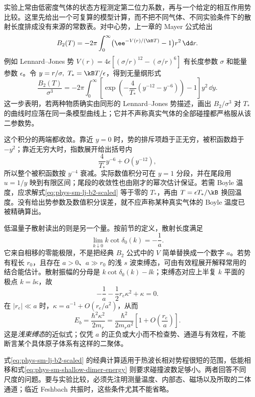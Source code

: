 实验上常由低密度气体的状态方程测定第二位力系数，再与一个给定的相互作用势比较。这里先给出一个可复算的模型计算，而不把不同气体、不同实验条件下的散射长度排成没有来源的常数表。对中心势，上一章的 Mayer 公式给出
\[
B_2(T)=-2\pi\int_0^\infty
\bigl(\ee^{-V(r)/(\kB T)}-1\bigr)r^2\,\dd r.
\]
例如 Lennard--Jones 势
\(V(r)=4\epsilon[(\sigma/r)^{12}-(\sigma/r)^6]\)
有长度参数 \(\sigma\) 和能量参数 \(\epsilon\)。令
\(y=r/\sigma,\ T_*=\kB T/\epsilon\)，得到无量纲形式
\begin{equation}
\frac{B_2(T)}{\sigma^3}
=-2\pi\int_0^\infty
\left[
\exp\!\left(-\frac4{T_*}(y^{-12}-y^{-6})\right)-1
\right]y^2\,\dd y .
\label{eq:phys-sm-lj-b2-scaled}
\end{equation}
这一步表明，若两种物质确实由同形的 Lennard--Jones 势描述，画出 \(B_2/\sigma^3\) 对 \(T_*\) 的曲线时应落在同一条模型曲线上；它并不声称真实气体的全部碰撞都严格服从该二参数势。

这个积分的两端都收敛。靠近 \(y=0\) 时，势的排斥项趋于正无穷，被积函数趋于 \(-y^2\)；靠近无穷大时，指数展开给出括号内
\[
\frac4{T_*}y^{-6}+O(y^{-12}),
\]
所以整个被积函数按 \(y^{-4}\) 衰减。实际数值积分可在 \(y=1\) 分段，并在尾段用 \(u=1/y\) 映到有限区间；尾段的收敛性也由刚才的幂次估计保证。若需 Boyle 温度，应求解式\cref{eq:phys-sm-lj-b2-scaled} 等于零的 \(T_*\)，再由 \(T=\epsilon T_*/\kB\) 换回温度。没有给出势参数及数值积分误差，就不应声称某种真实气体的 Boyle 温度已被精确算出。

低温量子散射读出的则是另一个量。按前节的定义，散射长度满足
\[
\lim_{k\downarrow0}k\cot\delta_0(k)=-\frac1a.
\]
它来自相移的零能极限，不是把经典 \(B_2\) 公式中的 \(V\) 简单替换成一个数字 \(a\)。若势有程长 \(r_0\)，且存在 \(a>0\)、\(a\gg r_0\) 的浅 \(s\) 波束缚态，可由有效程展开解释常用的结合能估计。散射振幅的分母是 \(k\cot\delta_0(k)-\ii k\)；束缚态对应上半复 \(k\) 平面的极点 \(k=\ii\kappa\)，故
\[
-\frac1a-\frac12r_e\kappa^2+\kappa=0.
\]
在 \(|r_e|\ll a\) 时，\(\kappa=a^{-1}+O(r_e/a^2)\)，从而
\begin{equation}
E_b=\frac{\hbar^2\kappa^2}{2m_r}
=\frac{\hbar^2}{2m_ra^2}
\left[1+O\!\left(\frac{r_e}{a}\right)\right].
\label{eq:phys-sm-shallow-dimer-energy}
\end{equation}
这是\emph{浅束缚态}的近似式；仅凭 \(a\) 的正负或大小而不检查势、通道与有效程，不能断言某个具体原子体系有这样的二聚体。

式\cref{eq:phys-sm-lj-b2-scaled} 的经典计算适用于热波长相对势程很短的范围，低能相移和式\cref{eq:phys-sm-shallow-dimer-energy} 则要求碰撞波数足够小。两者回答不同尺度的问题。要与实验比较，必须先注明测量温度、内部态、磁场以及所取的二体通道；临近 Feshbach 共振时，这些条件尤其不能省略。
